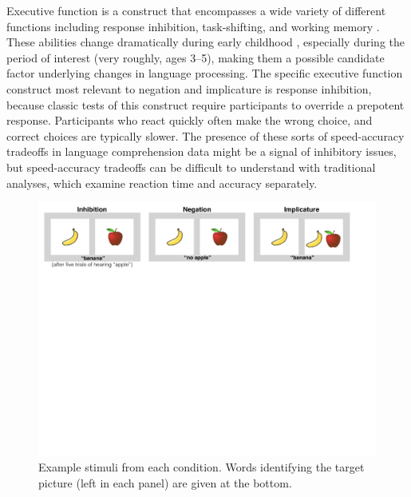 \documentclass[10pt,letterpaper]{article}
\begin{document}
Executive function is a construct that encompasses a wide variety of different functions including response inhibition, task-shifting, and working memory \cite{miyake2000}. These abilities change dramatically during early childhood \cite{diamond1996,davidson2006}, especially during the period of interest (very roughly, ages 3--5), making them a possible candidate factor underlying changes in language processing. The specific executive function construct most relevant to negation and implicature is response inhibition, because classic tests of this construct require participants to override a prepotent response. Participants who react quickly often make the wrong choice, and correct choices are typically slower. The presence of these sorts of speed-accuracy tradeoffs in language comprehension data might be a signal of inhibitory issues, but speed-accuracy tradeoffs can be difficult to understand with traditional analyses, which examine reaction time and accuracy separately.


\begin{figure}[t!]
\begin{centering}
\includegraphics[width=\textwidth]{figures/stimuli.pdf}
\caption{\label{fig:stimuli} Example stimuli from each condition. Words identifying the target picture (left in each panel) are given at the bottom.}
\end{centering}
\end{figure}
\end{document}
